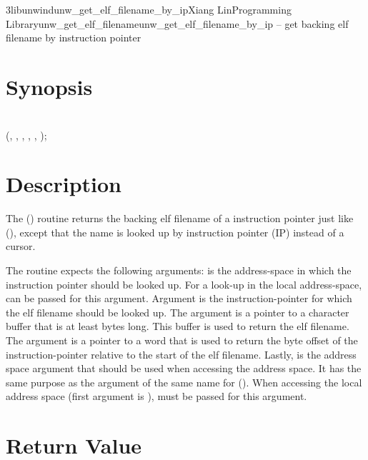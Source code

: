 \documentclass{article}
\begin{document}
\begin{Name}{3libunwind}{unw\_get\_elf\_filename\_by\_ip}{Xiang Lin}{Programming Library}{unw\_get\_elf\_filename}unw\_get\_elf\_filename\_by\_ip -- get backing elf filename by instruction pointer
\end{Name}

\section{Synopsis}

\\

 (, , ,  , , );\\

\section{Description}

The () routine returns the backing
elf filename of a instruction pointer just like (),
except that the name is looked up by instruction pointer (IP) instead
of a cursor.

The routine expects the following arguments:  is the
address-space in which the instruction pointer should be looked up.
For a look-up in the local address-space,
 can be passed for this argument.
Argument  is the instruction-pointer for which the elf filename
should be looked up.  The  argument is a pointer to
a character buffer that is at least  bytes long.  This buffer
is used to return the elf filename.  The  argument
is a pointer to a word that is used to return the byte offset of the
instruction-pointer relative to the start of the elf filename.
Lastly,  is the address space argument that should be used
when accessing the address space.  It has the same purpose as the
argument of the same name for ().  When
accessing the local address space (first argument is
),  must be passed for this
argument.

\section{Return Value}
\end{document}
